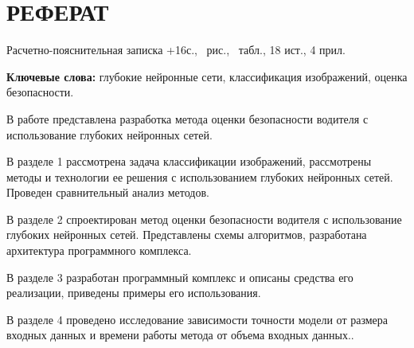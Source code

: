 \section*{РЕФЕРАТ}

\edef\nextpage{\the\numexpr{}+16\relax}
Расчетно-пояснительная записка \nextpage с., \totalfigures\ рис., \totaltables\ табл., 18 ист., 4 прил.

\textbf{Ключевые слова:} глубокие нейронные сети, классификация изображений, оценка безопасности.

В работе представлена разработка метода оценки безопасности водителя с использование глубоких нейронных сетей.

В разделе 1 рассмотрена задача классификации изображений, рассмотрены методы и технологии ее решения с использованием глубоких нейронных сетей. Проведен сравнительный анализ методов.

В разделе 2 спроектирован метод оценки безопасности водителя с использование глубоких нейронных сетей. Представлены схемы алгоритмов, разработана архитектура программного комплекса.

В разделе 3 разработан программный комплекс и описаны средства его реализации, приведены примеры его использования.

В разделе 4 проведено исследование зависимости точности модели от размера входных данных и времени работы метода от объема входных данных..


\pagebreak